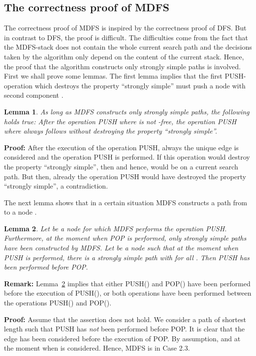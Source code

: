 \documentclass[12pt,twoside,a4paper]{article}
\def\QED{\hbox{\hskip 1pt \vrule width4pt height 6pt depth 1.5pt \hskip 1pt}}
\newtheorem{lemma}{Lemma}
\begin{document}
\subsection{The correctness proof of MDFS}

The correctness proof of MDFS is inspired by the correctness proof of DFS.
But in contrast to DFS, the proof is difficult. The difficulties come from the 
fact that the MDFS-stack does not contain the whole current search path and the 
decisions taken by the algorithm only depend on the content of the current stack.
Hence, the proof that the algorithm constructs only strongly simple paths is
involved. First we shall prove some lemmas. The first lemma implies that the first
PUSH-operation which destroys the property ``strongly simple'' must push 
a node with second component .
\begin{lemma}
As long as MDFS constructs only strongly simple paths, the following holds true:
After the operation PUSH where  is not -free, the
operation PUSH where  always follows without 
destroying the property ``strongly simple''.
\end{lemma}
{\bf Proof:} 
After the execution of the operation PUSH, always the unique edge 
 is considered and the operation PUSH is
performed. If this operation would destroy the property ``strongly simple'',
then  and hence,  would be on a current search path. But then,
already the operation PUSH would have destroyed the property ``strongly
simple'', a contradiction. 
\QED

\medskip
The next lemma shows that in a certain situation MDFS constructs a path from  to a 
node .
\begin{lemma} \label{Lemma1}
Let  be a node for which MDFS performs the operation
PUSH. Furthermore, at the moment when POP is performed, only strongly 
simple paths have been constructed by MDFS.
Let  be a node such that at the moment when PUSH is 
performed, there is a strongly simple path
 with 
for all . Then PUSH has been performed before POP.
\end{lemma}
{\bf Remark:} Lemma~\ref{Lemma1} implies that either PUSH() 
and POP() have been performed before the execution of PUSH(), 
or both operations have been performed between the operations PUSH() 
and POP().

\medskip
\noindent 
{\bf Proof:}
Assume that the assertion does not hold. We consider a path
 of shortest length such that 
PUSH has {\em not\/} been performed before POP.
It is clear that the edge  has been considered before the 
execution of POP. By assumption,  and 
at the moment when  is considered. Hence, MDFS is in Case 2.3.
\end{document}
